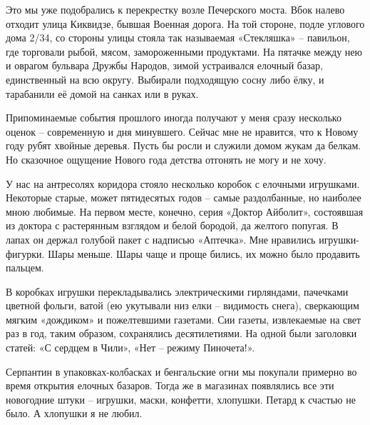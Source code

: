 Это мы уже подобрались к перекрестку возле Печерского моста. Вбок налево отходит улица Киквидзе, бывшая Военная дорога. На той стороне, подле углового дома 2/34, со стороны улицы стояла так называемая «Стекляшка» – павильон, где торговали рыбой, мясом, замороженными продуктами. На пятачке между нею и оврагом  бульвара Дружбы Народов, зимой устраивался елочный базар, единственный на всю округу. Выбирали подходящую сосну либо ёлку, и тарабанили её домой на санках или в руках.

Припоминаемые события прошлого иногда получают у меня сразу несколько оценок – современную и дня минувшего. Сейчас мне не нравится, что к Новому году рубят хвойные деревья. Пусть бы росли и служили домом жукам да белкам. Но сказочное ощущение Нового года детства отгонять не могу и не хочу.

У нас на антресолях коридора стояло несколько коробок с елочными игрушками. Некоторые старые, может пятидесятых годов – самые раздолбанные, но наиболее мною любимые. На первом месте, конечно, серия «Доктор Айболит», состоявшая из доктора с растерянным взглядом и белой бородой, да желтого попугая. В лапах он держал голубой пакет с надписью «Аптечка». Мне нравились игрушки-фигурки. Шары меньше. Шары чаще и проще бились, их можно было продавить пальцем.

В коробках игрушки перекладывались электрическими гирляндами, пачечками цветной фольги, ватой (ею укутывали низ елки – видимость снега), сверкающим мягким «дождиком» и пожелтевшими газетами. Сии газеты, извлекаемые на свет раз в год, таким образом, сохранялись десятилетиями. На одной были заголовки статей: «С сердцем в Чили», «Нет – режиму Пиночета!».

Серпантин в упаковках-колбасках и бенгальские огни мы покупали примерно во время открытия елочных базаров. Тогда же в магазинах появлялись все эти новогодние штуки – игрушки, маски, конфетти, хлопушки. Петард к счастью не было. А хлопушки я не любил.


